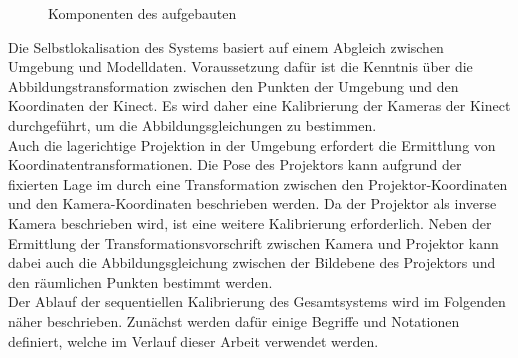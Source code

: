 \begin{figure}[ht]
	\begin{center}%
		\caption{Komponenten des aufgebauten }
		\label{fig.kinpro}
	\end{center}
\end{figure}

Die Selbstlokalisation des Systems basiert auf einem Abgleich zwischen Umgebung und Modelldaten. Voraussetzung dafür ist die Kenntnis über die Abbildungstransformation zwischen den Punkten der Umgebung und den Koordinaten der Kinect. Es wird daher eine Kalibrierung der Kameras der Kinect durchgeführt, um die Abbildungsgleichungen zu bestimmen.\\

Auch die lagerichtige Projektion in der Umgebung erfordert die Ermittlung von Koordinatentransformationen. Die Pose des Projektors kann aufgrund der fixierten Lage im \kps{} durch eine Transformation zwischen den Projektor-Koordinaten und den Kamera-Koordinaten beschrieben werden. Da der Projektor als inverse Kamera beschrieben wird, ist eine weitere Kalibrierung erforderlich. Neben der Ermittlung der Transformationsvorschrift zwischen Kamera und Projektor kann dabei auch die Abbildungsgleichung zwischen der Bildebene des Projektors und den räumlichen Punkten bestimmt werden.\\
Der Ablauf der sequentiellen Kalibrierung des Gesamtsystems wird im Folgenden näher beschrieben. Zunächst werden dafür einige Begriffe und Notationen definiert, welche im Verlauf dieser Arbeit verwendet werden.



